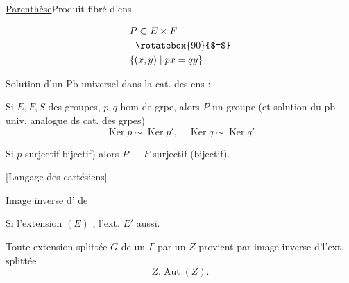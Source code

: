 \uline{Parenthèse}\qquad Produit fibré d'ens

\noindent\begin{minipage}[c]{.46\linewidth}
\end{minipage}\hfill
\begin{minipage}[c]{.49\linewidth}
\[
\begin{aligned}
&P\subset E\times F\\
&\hspace{.6em}\rotatebox{90}{$=$}\\
&\{(x,y)\mid px=qy\}
\end{aligned}
\]
\end{minipage}


Solution d'un Pb universel dans la cat. des ens :

Si $E,F,S$ des groupes, $p,q$ hom de grpe, alors $P$ un groupe (et solution du pb univ. analogue ds cat. des grpes)
\[
\operatorname{Ker}p\sim\operatorname{Ker}p',\quad
\operatorname{Ker}q\sim\operatorname{Ker}q'
\]

Si $p$ surjectif \unsure{(}bijectif) alors $P\mathbin{\text{---}}F$ surjectif (bijectif).

[Langage des  cartésiens]

Image inverse d' de 


Si l'extension $(E)$ , l'ext. $E'$ aussi.

 Toute extension splittée $G$ de un $\Gamma$ par un $Z$ provient par image inverse d'l'ext. splittée
\[
Z.\operatorname{Aut}(Z).
\]

